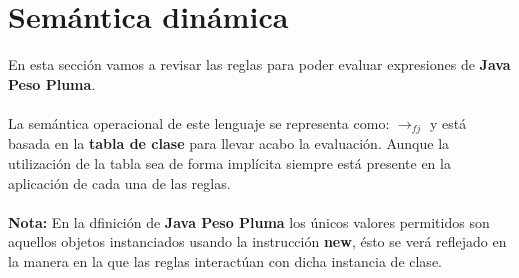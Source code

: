 \section{Semántica dinámica}
    En esta sección vamos a revisar las reglas para poder evaluar expresiones de \textbf{Java Peso Pluma}.\\\\
    La semántica operacional de este lenguaje se representa como: $\rightarrow_{fj}$ y está basada en la \textbf{tabla de clase} para llevar acabo la evaluación. Aunque la utilización de la tabla sea de forma implícita siempre está presente en la aplicación de cada una de las reglas.\\\\
    \textbf{Nota:} En la dfinición de \textbf{Java Peso Pluma} los únicos valores permitidos son aquellos objetos instanciados usando la instrucción \textbf{new}, ésto se verá reflejado en la manera en la que las reglas interactúan con dicha instancia de clase. 

    \bigskip
    
